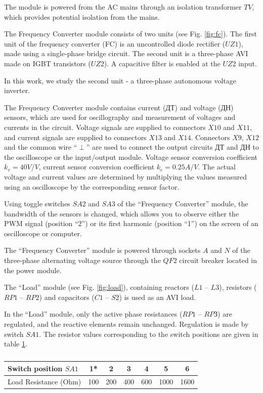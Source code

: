 \documentclass[a4paper,14pt]{article}
\begin{document}
The module is powered from the AC mains through an isolation transformer $TV$, which provides potential isolation from the mains.

The Frequency Converter module consists of two units (see Fig. \ref{fig:fc}). The first unit of the frequency converter (FC) is an uncontrolled diode rectifier ($UZ1$), made using a single-phase bridge circuit. The second unit is a three-phase AVI made on IGBT transistors ($UZ2$). A capacitive filter is enabled at the $UZ2$ input.

In this work, we study the second unit - a three-phase autonomous voltage inverter.

The Frequency Converter module contains current (ДТ) and voltage (ДН) sensors, which are used for oscillography and measurement of voltages and currents in the circuit. Voltage signals are supplied to connectors $X10$ and $X11$, and current signals are supplied to connectors $X13$ and $X14$. Connectors $X9$, $X12$ and the common wire “$\perp$” are used to connect the output circuits ДТ and ДН to the oscilloscope or the input/output module.
Voltage sensor conversion coefficient $k_v = 40 V/V$, current sensor conversion coefficient $k_c = 0.25 A/V$. The actual voltage and current values are determined by multiplying the values measured using an oscilloscope by the corresponding sensor factor.

Using toggle switches $SA2$ and $SA3$ of the “Frequency Converter” module, the bandwidth of the sensors is changed, which allows you to observe either the PWM signal (position “2”) or its first harmonic (position “1”) on the screen of an oscilloscope or computer.

The “Frequency Converter” module is powered through sockets $A$ and $N$ of the three-phase alternating voltage source through the $QF2$ circuit breaker located in the power module.

The “Load” module (see Fig. \ref{fig:load}), containing reactors ($L1$ -- $L3$), resistors ($RP1$ -- $RP2$) and capacitors ($C1$ -- $S2$) is used as an AVI load.

In the “Load” module, only the active phase resistances ($RP1$ -- $RPЗ$) are regulated, and the reactive elements remain unchanged.
Regulation is made by switch $SA1$. The resistor values corresponding to the switch positions are given in table \ref{table:resistors}.

\begin{table}[!ht]

\begin{tabular}{l|c|c|c|c|c|c}

Switch position $SA1$ &1*& 2& 3& 4& 5& 6\\
\midrule
Load Resistance (Ohm) &100 &200 &400 &600 & 1000 & 1600
\end{tabular}
   \caption{}
    \label{table:resistors}
\end{table}
\end{document}
